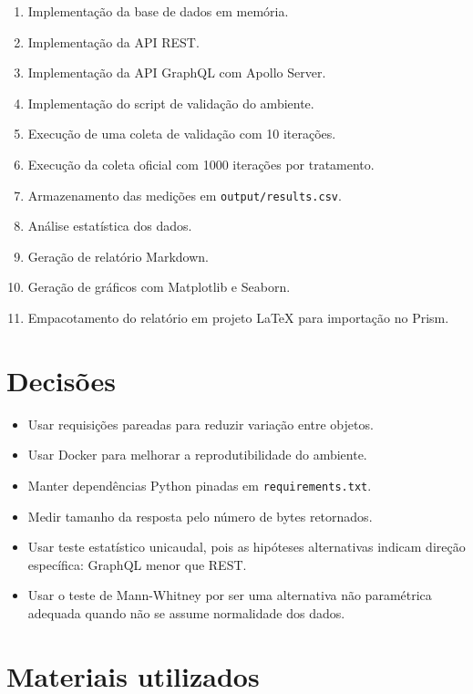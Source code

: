 \documentclass[12pt,a4paper]{article}
\begin{document}
\begin{enumerate}
  \item Implementação da base de dados em memória.
  \item Implementação da API REST.
  \item Implementação da API GraphQL com Apollo Server.
  \item Implementação do script de validação do ambiente.
  \item Execução de uma coleta de validação com 10 iterações.
  \item Execução da coleta oficial com 1000 iterações por tratamento.
  \item Armazenamento das medições em \texttt{output/results.csv}.
  \item Análise estatística dos dados.
  \item Geração de relatório Markdown.
  \item Geração de gráficos com Matplotlib e Seaborn.
  \item Empacotamento do relatório em projeto LaTeX para importação no Prism.
\end{enumerate}

\section{Decisões}

\begin{itemize}
  \item Usar requisições pareadas para reduzir variação entre objetos.
  \item Usar Docker para melhorar a reprodutibilidade do ambiente.
  \item Manter dependências Python pinadas em \texttt{requirements.txt}.
  \item Medir tamanho da resposta pelo número de bytes retornados.
  \item Usar teste estatístico unicaudal, pois as hipóteses alternativas indicam direção específica: GraphQL menor que REST.
  \item Usar o teste de Mann-Whitney por ser uma alternativa não paramétrica adequada quando não se assume normalidade dos dados.
\end{itemize}

\section{Materiais utilizados}
\end{document}
